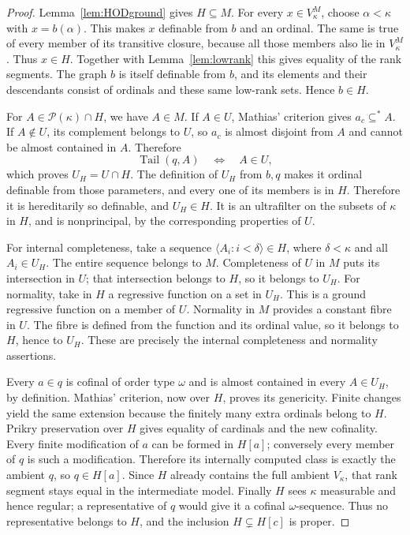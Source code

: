 \documentclass[11pt,letterpaper]{article}
\theoremstyle{definition}
\numberwithin{equation}{section}
\newcommand{\tail}{\operatorname{Tail}}
\newcommand{\powerset}{\mathcal P}
\begin{document}
\begin{proof}
Lemma~\ref{lem:HODground} gives $H\subseteq M$. For every $x\in
V_\kappa^M$, choose $\alpha<\kappa$ with $x=b(\alpha)$. This makes $x$
definable from $b$ and an ordinal. The same is true of every member of its
transitive closure, because all those members also lie in $V_\kappa^M$.
Thus $x\in H$. Together with Lemma~\ref{lem:lowrank} this gives equality
of the rank segments. The graph $b$ is itself definable from $b$, and
its elements and their descendants consist of ordinals and these same
low-rank sets. Hence $b\in H$.

For $A\in\powerset(\kappa)\cap H$, we have $A\in M$. If $A\in U$,
Mathias' criterion gives $a_c\subseteq^*A$. If $A\notin U$, its complement
belongs to $U$, so $a_c$ is almost disjoint from $A$ and cannot be almost
contained in $A$. Therefore
\[
 \tail(q,A)\quad\Longleftrightarrow\quad A\in U,
\]
which proves $U_H=U\cap H$. The definition of $U_H$ from $b,q$ makes it
ordinal definable from those parameters, and every one of its members is
in $H$. Therefore it is hereditarily so definable, and $U_H\in H$.
It is an ultrafilter on the subsets of $\kappa$ in $H$, and is
nonprincipal, by the corresponding properties of $U$.

For internal completeness, take a sequence $\langle A_i:i<\delta\rangle
\in H$, where $\delta<\kappa$ and all $A_i\in U_H$. The entire sequence
belongs to $M$. Completeness of $U$ in $M$ puts its intersection in $U$;
that intersection belongs to $H$, so it belongs to $U_H$. For normality,
take in $H$ a regressive function on a set in $U_H$. This is a ground
regressive function on a member of $U$. Normality in $M$ provides a
constant fibre in $U$. The fibre is defined from the function and its
ordinal value, so it belongs to $H$, hence to $U_H$. These are precisely
the internal completeness and normality assertions.

Every $a\in q$ is cofinal of order type $\omega$ and is almost contained
in every $A\in U_H$, by definition. Mathias' criterion, now over $H$,
proves its genericity. Finite changes yield the same extension because
the finitely many extra ordinals belong to $H$. Prikry preservation over
$H$ gives equality of cardinals and the new cofinality. Every finite
modification of $a$ can be formed in $H[a]$; conversely every member of
$q$ is such a modification. Therefore its internally computed class is
exactly the ambient $q$, so $q\in H[a]$. Since $H$ already contains the
full ambient $V_\kappa$, that rank segment stays equal in the intermediate
model. Finally $H$ sees $\kappa$ measurable and hence regular; a
representative of $q$ would give it a cofinal $\omega$-sequence. Thus no
representative belongs to $H$, and the inclusion $H\subsetneq H[c]$
is proper.
\end{proof}
\end{document}
